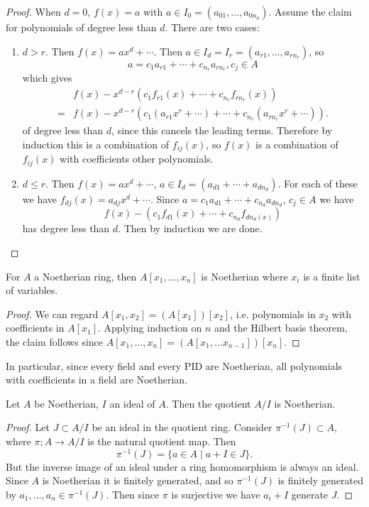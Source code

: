 \begin{proof}
When $d = 0$, $f(x) = a$ with $a \in I_0 = (a_{01}, \dots,
a_{0n_0})$. Assume the claim for polynomials of degree less than
$d$. There are two cases:
\begin{enumerate}
\item{
  $d > r$. Then $f(x) = ax^d + \cdots$. Then
  $a \in I_d = I_r = (a_{r1}, \dots, a_{r n_r})$, so
  $$
  a = c_1 a_{r1} + \cdots + c_{n_r} a_{r n_r}, c_j \in A
  $$
  which gives
  \begin{align*}
     & f(x) - x^{d-r}(c_1 f_{r1}(x) + \cdots + c_{n_r} f_{r n_r}(x))\\
   = & f(x) - x^{d-r}(c_1 (a_{r1} x^r + \cdots )
                     + \cdots
                     + c_{n_r}(a_{rn_r} x^r + \cdots)).
  \end{align*}
  of degree less than $d$, since this cancels the leading
  terms. Therefore by induction this is a combination of $f_{ij}(x)$,
  so $f(x)$ is a combination of $f_{ij}(x)$ with coefficients other polynomials.
}
\item{
  $d \leq r$. Then $f(x) = a x^d + \cdots$,
  $a \in I_d = (a_{d1} + \cdots + a_{dn_d})$. For each of these we
  have $f_{dj}(x) = a_{dj}x^d + \cdots$. Since
  $a = c_1 a_{d1} + \cdots + c_{n_d} a_{d n_d}$, $c_j \in A$ we have
  $$
  f(x) - (c_1 f_{d1}(x) + \cdots + c_{n_d} f_{dn_d(x)})
  $$
  has degree less than $d$. Then by induction we are done.
}
\end{enumerate}
\end{proof}

\begin{corol}
For $A$ a Noetherian ring, then $A[x_1, \dots, x_n]$ is Noetherian
where $x_i$ is a finite list of variables.
\end{corol}
\begin{proof}
We can regard $A[x_1, x_2] = (A[x_1])[x_2]$, i.e. polynomials in $x_2$
with coefficients in $A[x_1]$. Applying induction on $n$ and the
Hilbert basis theorem, the claim follows since
$A[x_1, \dots, x_n] = (A[x_1, \dots x_{n-1}])[x_n]$.
\end{proof}

In particular, since every field and every PID are Noetherian,
all polynomials with coefficients in a field are Noetherian.

\begin{prop}
Let $A$ be Noetherian, $I$ an ideal of $A$. Then the quotient
$A / I$ is Noetherian.
\end{prop}
\begin{proof}
Let $J \subset A / I$ be an ideal in the quotient ring. Consider
$\pi^{-1}(J) \subset A$, where $\pi : A \to A / I$ is the natural
quotient map. Then
$$
\pi^{-1}(J) = \{ a \in A \mid a + I \in J \}.
$$
But the inverse image of an ideal under a ring homomorphism is always
an ideal. Since $A$ is Noetherian it is finitely generated, and so
$\pi^{-1}(J)$ is finitely generated by $a_1, \dots, a_n \in
\pi^{-1}(J)$. Then since $\pi$ is surjective we have $a_i + I$
generate $J$.
\end{proof}

